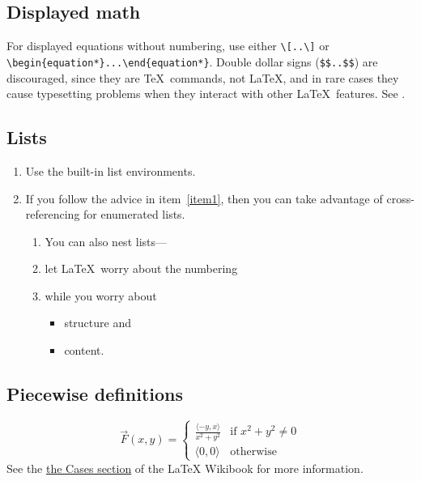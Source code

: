 \documentclass[11pt]{amsart}
\theoremstyle{theorem} %
\theoremstyle{definition}                  %
\theoremstyle{example}                       %
\theoremstyle{remark}                       %
\numberwithin{equation}{section}
\begin{document}
\subsection{Displayed math}
For displayed equations without numbering, use either \verb+\[..\]+ or \verb+\begin{equation*}...\end{equation*}+. 
Double dollar signs (\verb+$$..$$+) are discouraged, since they are \TeX\ commands, not \LaTeX, and in rare
  cases they cause typesetting problems when they interact with other \LaTeX\ features.  See \cite [\S 1.6]{tabu}.

\subsection{Lists}
\begin{enumerate}
\item Use the built-in list environments. \label{item1}
\item If you follow the advice in item~\ref{item1}, then you can take advantage of cross-referencing for enumerated lists.
\begin{enumerate}
\item You can also nest lists---
\item let \LaTeX\ worry about the numbering
\item while you worry about 
\begin{itemize}
\item structure and
\item content.
\end{itemize}
\end{enumerate}


\end{enumerate}



\subsection{Piecewise definitions}
\begin{equation}
\vec{F}(x,y)=
	\begin{cases}
		 \frac{\langle -y,x\rangle}{x^2+y^2} & \text{if } x^2+y^2\neq 0\\
		\langle 0,0\rangle & \text{otherwise}
	\end{cases}
\end{equation}
See the \href{https://en.wikibooks.org/wiki/LaTeX/Advanced_Mathematics#The_cases_environment}{the Cases section} of the LaTeX Wikibook \cite{wikibook} for more information.
\end{document}

